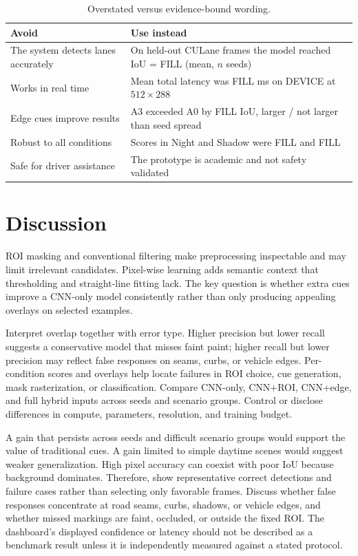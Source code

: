 \documentclass[10pt,a4paper,twocolumn]{article}
\begin{document}
\begin{table}[H]
\centering
\caption{Overstated versus evidence-bound wording.}
\footnotesize
\begin{tabularx}{\columnwidth}{|X|X|}
\hline
\rowcolor{gray!18}\textbf{Avoid}&\textbf{Use instead}\\ \hline
The system detects lanes accurately & On held-out CULane frames the model reached IoU = FILL (mean, $n$ seeds)\\ \hline
Works in real time & Mean total latency was FILL ms on DEVICE at $512\times288$\\ \hline
Edge cues improve results & A3 exceeded A0 by FILL IoU, larger / not larger than seed spread\\ \hline
Robust to all conditions & Scores in Night and Shadow were FILL and FILL\\ \hline
Safe for driver assistance & The prototype is academic and not safety validated\\ \hline
\end{tabularx}
\end{table}

\section{Discussion}\label{sec:discussion}
ROI masking and conventional filtering make preprocessing inspectable and may limit irrelevant candidates. Pixel-wise learning adds semantic context that thresholding and straight-line fitting lack. The key question is whether extra cues improve a CNN-only model consistently rather than only producing appealing overlays on selected examples.

Interpret overlap together with error type. Higher precision but lower recall suggests a conservative model that misses faint paint; higher recall but lower precision may reflect false responses on seams, curbs, or vehicle edges. Per-condition scores and overlays help locate failures in ROI choice, cue generation, mask rasterization, or classification. Compare CNN-only, CNN+ROI, CNN+edge, and full hybrid inputs across seeds and scenario groups. Control or disclose differences in compute, parameters, resolution, and training budget.

A gain that persists across seeds and difficult scenario groups would support the value of traditional cues. A gain limited to simple daytime scenes would suggest weaker generalization. High pixel accuracy can coexist with poor IoU because background dominates. Therefore, show representative correct detections and failure cases rather than selecting only favorable frames. Discuss whether false responses concentrate at road seams, curbs, shadows, or vehicle edges, and whether missed markings are faint, occluded, or outside the fixed ROI. The dashboard's displayed confidence or latency should not be described as a benchmark result unless it is independently measured against a stated protocol.
\end{document}
